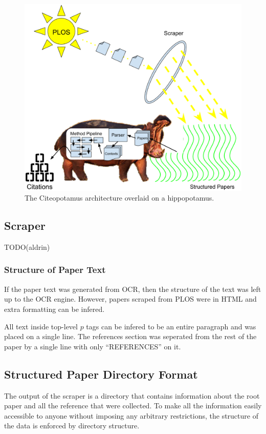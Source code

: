 \documentclass[10pt, conference, compsocconf]{IEEEtran}
\begin{document}
\begin{figure}[ht]
   \includegraphics[width=\textwidth px]{images/arch.eps}
        \caption{The Citeopotamus architecture overlaid on a hippopotamus.}
        \label{fig:arch}
\end{figure}

\subsection{Scraper}
TODO(aldrin)

\subsubsection{Structure of Paper Text}
If the paper text was generated from OCR, then the structure of the text was left up to the OCR engine.
However, papers scraped from PLOS were in HTML and extra formatting can be infered.

All text inside top-level $p$ tags can be infered to be an entire paragraph and was placed on a single line.
The references section was seperated from the rest of the paper by a single line with only ``REFERENCES'' on it.

\subsection{Structured Paper Directory Format}
The output of the scraper is a directory that contains information about the root paper and all the reference that were collected.
To make all the information easily accessible to anyone without imposing any arbitrary restrictions, the structure of the
data is enforced by directory structure.
\end{document}
